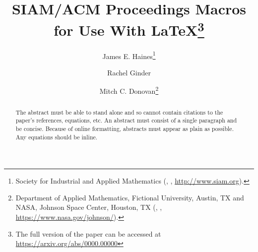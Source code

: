 \documentclass[twoside,leqno]{article}
\begin{document}
%
\newcommand\relatedversion{}
\renewcommand\relatedversion{\thanks{The full version of the paper can be accessed at \protect\url{https://arxiv.org/abs/0000.00000}}} %

\title{\Large SIAM/ACM Proceedings Macros for Use With LaTeX\relatedversion}
    \author{James E. Haines\thanks{Society for Industrial and Applied Mathematics (, , \url{http://www.siam.org}).}
    \and Rachel Ginder\footnotemark[2]    
    \and Mitch C. Donovan\thanks{Department of Applied Mathematics, Fictional University, Austin, TX and NASA, Johnson Space Center, Houston, TX
  (, , \url{https://www.nasa.gov/johnson/}).}}

\date{}

\maketitle







\begin{abstract} The abstract must be able to stand alone and so cannot contain citations to the paper's references, equations, etc.  An abstract must consist of a single paragraph and be concise. Because of online formatting, abstracts must appear as plain as possible. Any equations should be inline.
\end{abstract}
\end{document}
